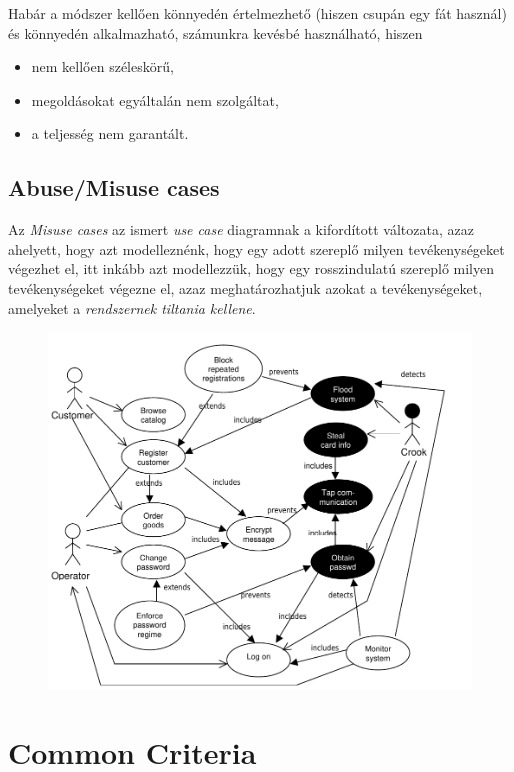 Habár a módszer kellően könnyedén értelmezhető (hiszen csupán egy fát használ) és könnyedén
alkalmazható, számunkra kevésbé használható, hiszen
\begin{itemize}
    \item{nem kellően széleskörű,}
    \item{megoldásokat egyáltalán nem szolgáltat,}
    \item{a teljesség nem garantált.}
\end{itemize}

\subsection{Abuse/Misuse cases}

Az \emph{Misuse cases} az ismert \emph{use case} diagramnak a kifordított változata, azaz ahelyett,
hogy azt modelleznénk, hogy egy adott szereplő milyen tevékenységeket végezhet el, itt inkább azt
modellezzük, hogy egy rosszindulatú szereplő milyen tevékenységeket végezne el, azaz
meghatározhatjuk azokat a tevékenységeket, amelyeket a \emph{rendszernek tiltania kellene}.

\begin{figure}[h]
    \centering
    \includegraphics[width=\textwidth, height=0.5\textheight, keepaspectratio]{figures/misusecase.png}
\end{figure}

\FloatBarrier

\section{Common Criteria}

